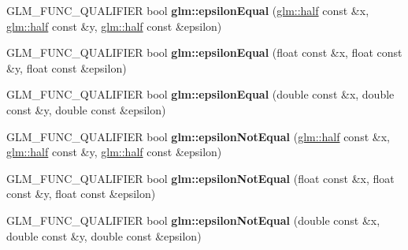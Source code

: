 \begin{DoxyCompactItemize}
\item 
\hypertarget{namespaceglm_ad274b28685a678c8c35a7f05d441b99a}{G\-L\-M\-\_\-\-F\-U\-N\-C\-\_\-\-Q\-U\-A\-L\-I\-F\-I\-E\-R bool {\bfseries glm\-::epsilon\-Equal} (\hyperlink{group__gtc__half__float_gadae4de950aa2230455634615b782c151}{glm\-::half} const \&x, \hyperlink{group__gtc__half__float_gadae4de950aa2230455634615b782c151}{glm\-::half} const \&y, \hyperlink{group__gtc__half__float_gadae4de950aa2230455634615b782c151}{glm\-::half} const \&epsilon)}\label{namespaceglm_ad274b28685a678c8c35a7f05d441b99a}

\item 
\hypertarget{namespaceglm_a36ee9e191ca38883c7341ed5e4265f23}{G\-L\-M\-\_\-\-F\-U\-N\-C\-\_\-\-Q\-U\-A\-L\-I\-F\-I\-E\-R bool {\bfseries glm\-::epsilon\-Equal} (float const \&x, float const \&y, float const \&epsilon)}\label{namespaceglm_a36ee9e191ca38883c7341ed5e4265f23}

\item 
\hypertarget{namespaceglm_a26a3437bb1eab4cf96a6ce4d299c88f3}{G\-L\-M\-\_\-\-F\-U\-N\-C\-\_\-\-Q\-U\-A\-L\-I\-F\-I\-E\-R bool {\bfseries glm\-::epsilon\-Equal} (double const \&x, double const \&y, double const \&epsilon)}\label{namespaceglm_a26a3437bb1eab4cf96a6ce4d299c88f3}

\item 
\hypertarget{namespaceglm_a3b4f1ae0a0d68c1d65169509b89ac828}{G\-L\-M\-\_\-\-F\-U\-N\-C\-\_\-\-Q\-U\-A\-L\-I\-F\-I\-E\-R bool {\bfseries glm\-::epsilon\-Not\-Equal} (\hyperlink{group__gtc__half__float_gadae4de950aa2230455634615b782c151}{glm\-::half} const \&x, \hyperlink{group__gtc__half__float_gadae4de950aa2230455634615b782c151}{glm\-::half} const \&y, \hyperlink{group__gtc__half__float_gadae4de950aa2230455634615b782c151}{glm\-::half} const \&epsilon)}\label{namespaceglm_a3b4f1ae0a0d68c1d65169509b89ac828}

\item 
\hypertarget{namespaceglm_ad109ef08ab83eca25da51ca138a0a2f1}{G\-L\-M\-\_\-\-F\-U\-N\-C\-\_\-\-Q\-U\-A\-L\-I\-F\-I\-E\-R bool {\bfseries glm\-::epsilon\-Not\-Equal} (float const \&x, float const \&y, float const \&epsilon)}\label{namespaceglm_ad109ef08ab83eca25da51ca138a0a2f1}

\item 
\hypertarget{namespaceglm_a5d57149702e714db5701596a5f8bf52b}{G\-L\-M\-\_\-\-F\-U\-N\-C\-\_\-\-Q\-U\-A\-L\-I\-F\-I\-E\-R bool {\bfseries glm\-::epsilon\-Not\-Equal} (double const \&x, double const \&y, double const \&epsilon)}\label{namespaceglm_a5d57149702e714db5701596a5f8bf52b}


\end{DoxyCompactItemize}
